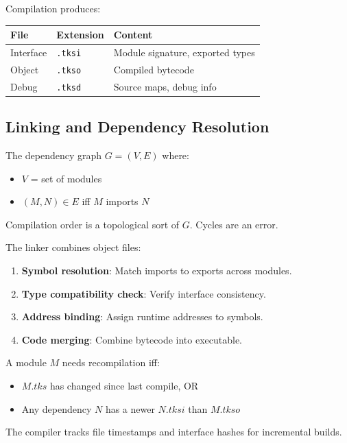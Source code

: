 \begin{definition}
\label{def:artifacts}
Compilation produces:
\begin{center}
\begin{tabular}{llp{7cm}}
\toprule
\textbf{File} & \textbf{Extension} & \textbf{Content} \\
\midrule
Interface & \texttt{.tksi} & Module signature, exported types \\
Object & \texttt{.tkso} & Compiled bytecode \\
Debug & \texttt{.tksd} & Source maps, debug info \\
\bottomrule
\end{tabular}
\end{center}
\end{definition}

\subsection{Linking and Dependency Resolution}
\label{subsec:linking}

\begin{definition}
\label{def:dependency-graph}
The dependency graph $G = (V, E)$ where:
\begin{itemize}
  \item $V$ = set of modules
  \item $(M, N) \in E$ iff $M$ imports $N$
\end{itemize}
Compilation order is a topological sort of $G$. Cycles are an error.
\end{definition}

\begin{definition}
\label{def:linking-process}
The linker combines object files:
\begin{enumerate}
  \item \textbf{Symbol resolution}: Match imports to exports across modules.
  \item \textbf{Type compatibility check}: Verify interface consistency.
  \item \textbf{Address binding}: Assign runtime addresses to symbols.
  \item \textbf{Code merging}: Combine bytecode into executable.
\end{enumerate}
\end{definition}

\begin{definition}
\label{def:incremental}
A module $M$ needs recompilation iff:
\begin{itemize}
  \item $M.tks$ has changed since last compile, OR
  \item Any dependency $N$ has a newer $N.tksi$ than $M.tkso$
\end{itemize}
The compiler tracks file timestamps and interface hashes for incremental builds.
\end{definition}

